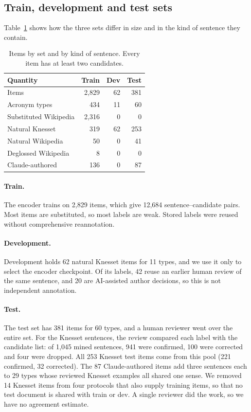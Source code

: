 \documentclass[11pt]{article}
\begin{document}
\subsection{Train, development and test sets}
Table~\ref{tab:data} shows how the three sets differ in size and in the kind of sentence they contain.

\begin{table}[t]
\centering\small
\begin{tabular}{@{}lrrr@{}}
\toprule
Quantity & Train & Dev & Test \\
\midrule
Items & 2,829 & 62 & 381 \\
Acronym types & 434 & 11 & 60 \\
\midrule
Substituted Wikipedia & 2,316 & 0 & 0 \\
Natural Knesset & 319 & 62 & 253 \\
Natural Wikipedia & 50 & 0 & 41 \\
Deglossed Wikipedia & 8 & 0 & 0 \\
Claude-authored & 136 & 0 & 87 \\
\bottomrule
\end{tabular}
\caption{Items by set and by kind of sentence. Every item has at least two candidates.}
\label{tab:data}
\end{table}

\paragraph{Train.} The encoder trains on 2,829 items, which give 12,684 sentence--candidate pairs. Most items are substituted, so most labels are weak. Stored labels were reused without comprehensive reannotation.

\paragraph{Development.} Development holds 62 natural Knesset items for 11 types, and we use it only to select the encoder checkpoint. Of its labels, 42 reuse an earlier human review of the same sentence, and 20 are AI-assisted author decisions, so this is not independent annotation.

\paragraph{Test.} The test set has 381 items for 60 types, and a human reviewer went over the entire set. For the Knesset sentences, the review compared each label with the candidate list: of 1,045 mined sentences, 941 were confirmed, 100 were corrected and four were dropped. All 253 Knesset test items come from this pool (221 confirmed, 32 corrected). The 87 Claude-authored items add three sentences each to 29 types whose reviewed Knesset examples all shared one sense. We removed 14 Knesset items from four protocols that also supply training items, so that no test document is shared with train or dev. A single reviewer did the work, so we have no agreement estimate.
\end{document}
